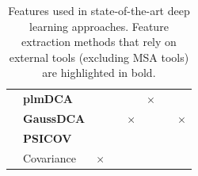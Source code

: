 \begin{landscape}
\begin{table}[H]
\begin{tabular}{llcccccc}
                    & \textbf{plmDCA} & & & & $\times$ & & \\
                    & \textbf{GaussDCA} & & & $\times$ & & & $\times$ \\
                    & \textbf{PSICOV} & & & & & & \\
                    & Covariance & $\times$ & & & & & \\
                    \hline
                \end{tabular}
                    \caption{Features used in state-of-the-art deep learning approaches.
                        Feature extraction methods that rely on external tools (excluding
                        MSA tools) are highlighted in bold.}
                    \label{features}
            \end{table}
        \end{landscape}